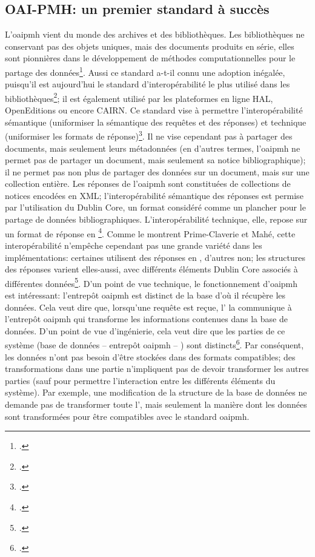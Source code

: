 \subsection{OAI-PMH: un premier standard à succès}
L'\gls{oaipmh} vient du monde des archives et des bibliothèques. Les bibliothèques ne conservant pas des objets uniques, mais des documents produits en série, elles sont pionnières dans le développement de méthodes computationnelles pour le partage des données\footcite[p. 2-3]{prime-claverie_defi_2017}. Aussi ce standard a-t-il connu une adoption inégalée, puisqu'il est aujourd'hui le standard d'interopérabilité le plus utilisé dans les bibliothèques\footcite[p. 5]{prime-claverie_defi_2017}; il est également utilisé par les plateformes en ligne HAL, OpenEditions ou encore CAIRN. Ce standard vise à permettre l'interopérabilité sémantique (uniformiser la sémantique des requêtes et des réponses) et technique (uniformiser les formats de réponse)\footcite[p. 6-14]{prime-claverie_defi_2017}. Il ne vise cependant pas à partager des documents, mais seulement leurs métadonnées (en d'autres termes, l'\gls{oaipmh} ne permet pas de partager un document, mais seulement sa notice bibliographique); il ne permet pas non plus de partager des données sur un document, mais sur une collection entière. Les réponses de l'\gls{oaipmh} sont constituées de collections de notices encodées en XML; l'interopérabilité sémantique des réponses est permise par l'utilisation du Dublin Core, un format considéré comme un plancher pour le partage de données bibliographiques. L'interopérabilité technique, elle, repose sur un format de réponse en \xml{}\footcite[p. 4]{prime-claverie_defi_2017}. Comme le montrent Prime-Claverie et Mahé, cette interopérabilité n'empêche cependant pas une grande variété dans les implémentations: certaines utilisent des réponses en \xmltei{}, d'autres non; les structures des réponses varient elles-aussi, avec différents éléments Dublin Core associés à différentes données\footcite[p. 6-14]{prime-claverie_defi_2017}. D'un point de vue technique, le fonctionnement d'\gls{oaipmh} est intéressant: l'entrepôt \gls{oaipmh} est distinct de la base d'où il récupère les données. Cela veut dire que, lorsqu'une requête est reçue, l'\api{} la communique à l'entrepôt \gls{oaipmh} qui transforme les informations contenues dans la base de données. D'un point de vue d'ingénierie, cela veut dire que les parties de ce système (base de données -- entrepôt \gls{oaipmh} -- \api{}) sont distincts\footcite[p. 4]{prime-claverie_defi_2017}. Par conséquent, les données n'ont pas besoin d'être stockées dans des formats compatibles; des transformations dans une partie n'impliquent pas de devoir transformer les autres parties (sauf pour permettre l'interaction entre les différents éléments du système). Par exemple, une modification de la structure de la base de données ne demande pas de transformer toute l'\api{}, mais seulement la manière dont les données sont transformées pour être compatibles avec le standard \gls{oaipmh}. 

